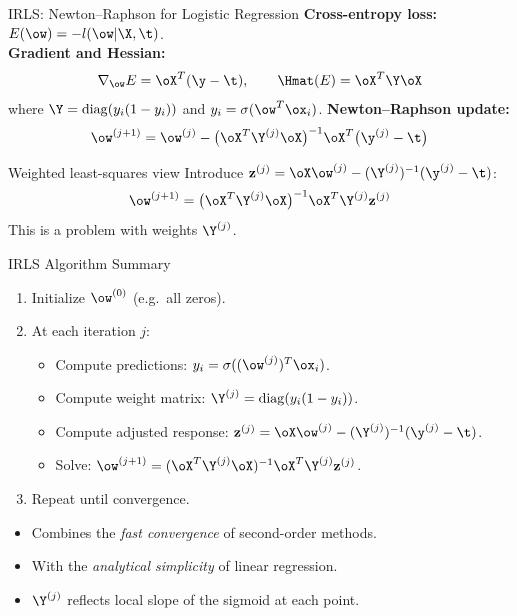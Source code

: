 \begin{frame}{IRLS: Newton--Raphson for Logistic Regression}
  \textbf{Cross-entropy loss:} $E(\ow) = -l(\ow|\X,\t)$.\\[0.4em]
  \textbf{Gradient and Hessian:}
  \[
    \nabla_{\ow}E = \oX^T(\y - \t), \qquad
    \Hmat(E) = \oX^T\Y\oX
  \]
  where $\Y = \mathrm{diag}(y_i(1-y_i))$ and $y_i = \sigma(\ow^T\ox_i)$.
  \vspace{0.3cm}
  \textbf{Newton--Raphson update:}
  \[
    \ow^{(j+1)} = \ow^{(j)} - \bigl(\oX^T\Y^{(j)}\oX\bigr)^{-1}\oX^T\bigl(\y^{(j)} - \t\bigr)
  \]
  \begin{block}{Weighted least-squares view}
    Introduce  $\mathbf{z}^{(j)} = \oX\ow^{(j)} - (\Y^{(j)})^{-1}(\y^{(j)}-\t)$:
    \[
      \ow^{(j+1)} = \bigl(\oX^T\Y^{(j)}\oX\bigr)^{-1}\oX^T\Y^{(j)}\mathbf{z}^{(j)}
    \]
    This is a  problem with weights $\Y^{(j)}$.
  \end{block}
\end{frame}

\begin{frame}{IRLS Algorithm Summary}
  \vspace{0.3cm}
  \begin{enumerate}
    \item Initialize $\ow^{(0)}$ (e.g.\ all zeros).
    \item At each iteration $j$:
      \begin{itemize}
        \item Compute predictions: $y_i = \sigma((\ow^{(j)})^T\ox_i)$.
        \item Compute weight matrix: $\Y^{(j)} = \mathrm{diag}(y_i(1-y_i))$.
        \item Compute adjusted response: $\mathbf{z}^{(j)} = \oX\ow^{(j)} - (\Y^{(j)})^{-1}(\y^{(j)}-\t)$.
        \item Solve: $\ow^{(j+1)} = (\oX^T\Y^{(j)}\oX)^{-1}\oX^T\Y^{(j)}\mathbf{z}^{(j)}$.
      \end{itemize}
    \item Repeat until convergence.
  \end{enumerate}
  \vspace{0.3cm}
  \begin{itemize}
    \item Combines the \emph{fast convergence} of second-order methods.
    \item With the \emph{analytical simplicity} of linear regression.
    \item $\Y^{(j)}$ reflects local slope of the sigmoid at each point.
  \end{itemize}
\end{frame}

